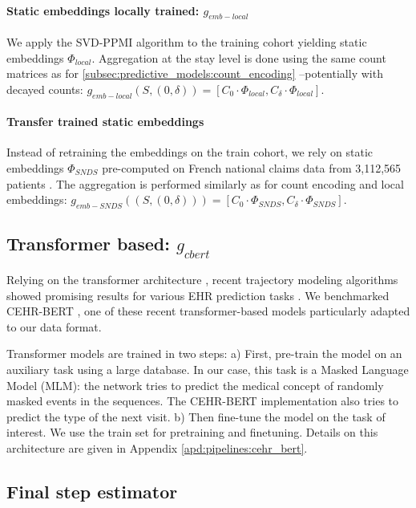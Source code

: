 \documentclass[french,12pt,twoside,a4paper]{book}
\begin{document}
\paragraph{Static embeddings locally trained: $g_{emb-local}$} We apply the
SVD-PPMI algorithm to the training cohort yielding static embeddings
$\Phi_{local}$. Aggregation at the stay level is done using the same
count matrices as for \ref{subsec:predictive_models:count_encoding} --potentially
with decayed counts: $g_{emb-local}(S, (0, \delta))=[C_{0} \cdot \Phi_{local}, C_{\delta} \cdot \Phi_{local}]$.

\paragraph{Transfer trained static embeddings} Instead of retraining the
embeddings on the train cohort, we rely on static embeddings $\Phi_{SNDS}$
pre-computed on French national claims data from 3,112,565 patients
\citep{doutrelignerepresentations}. The aggregation is performed similarly as
for count encoding and local embeddings: $g_{emb-SNDS}((S, (0, \delta))) = [C_{0} \cdot \Phi_{SNDS}, C_{\delta} \cdot
  \Phi_{SNDS}]$.

\subsection{Transformer based: $g_{cbert}$}%
\label{subsec:predictive_models:transformer}%

Relying on the transformer architecture \citep{vaswani2017attention}, recent
trajectory modeling algorithms showed promising results for various EHR
prediction tasks \citep{li2020behrt, rasmy2021med,pang2021cehr}. We benchmarked CEHR-BERT
\citep{pang2021cehr}, one of these recent transformer-based models particularly
adapted to our data format.

Transformer models are trained in two steps: a) First, pre-train the model on an
auxiliary task using a large database. In our case, this task is a Masked Language
Model (MLM): the network tries to predict the medical concept of randomly masked
events in the sequences. The CEHR-BERT implementation also tries to predict the
type of the next visit. b) Then fine-tune the model on the task of interest. We
use the train set for pretraining and finetuning. Details on this
architecture are given in Appendix \ref{apd:pipelines:cehr_bert}.

\subsection{Final step estimator}\label{subsec:predictive_models:estimators}
\end{document}
